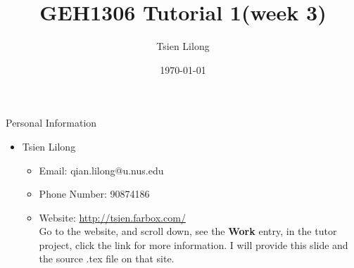 \documentclass{beamer}
\author{Tsien Lilong}
\title{GEH1306 Tutorial 1(week 3)}
\date{\today}
\begin{document}
\titlepageframe


\begin{tframe}{Personal Information}
  \begin{itemize}
    \item Tsien Lilong
          \begin{itemize}
            \item Email: qian.lilong@u.nus.edu
            \item Phone Number: 90874186
            \item Website: \url{http://tsien.farbox.com/}\\
                  Go to the website, and scroll down, see the \textbf{Work} entry, in the tutor project, click the link
                  for more information. I will provide this slide and the source .tex file on that site.
          \end{itemize}
  \end{itemize}
\end{tframe}
\end{document}
